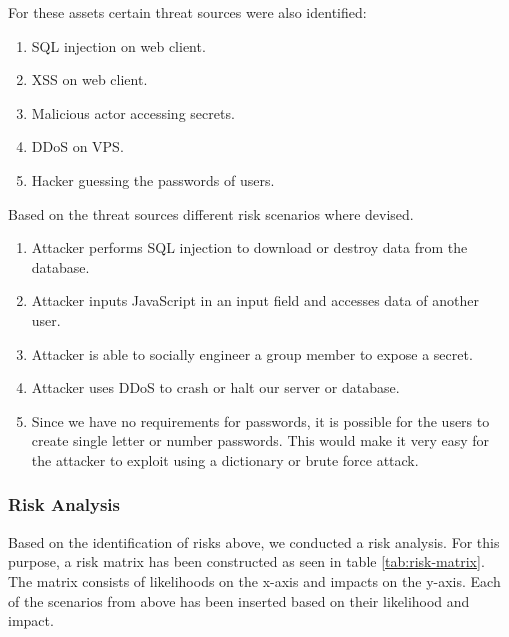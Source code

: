 \documentclass{article}
\begin{document}
\noindent For these assets certain threat sources were also identified:

\begin{enumerate}
    \item SQL injection on web client.
    \item XSS on web client.
    \item Malicious actor accessing secrets.
    \item DDoS on VPS.
    \item Hacker guessing the passwords of users.
\end{enumerate}

\noindent Based on the threat sources different risk scenarios where devised.

\begin{enumerate}
    \item Attacker performs SQL injection to download or destroy data from the database.
    \item Attacker inputs JavaScript in an input field and accesses data of another user.
    \item Attacker is able to socially engineer a group member to expose a secret.
    \item Attacker uses DDoS to crash or halt our server or database.
    \item Since we have no requirements for passwords, it is possible for the users to create single letter or number passwords. This would make it very easy for the attacker to exploit using a dictionary or brute force attack.
\end{enumerate}

\subsubsection*{Risk Analysis}
Based on the identification of risks above, we conducted a risk analysis. For this purpose, a risk matrix has been constructed as seen in table \ref{tab:risk-matrix}. The matrix consists of likelihoods on the x-axis and impacts on the y-axis. Each of the scenarios from above has been inserted based on their likelihood and impact.
\end{document}

